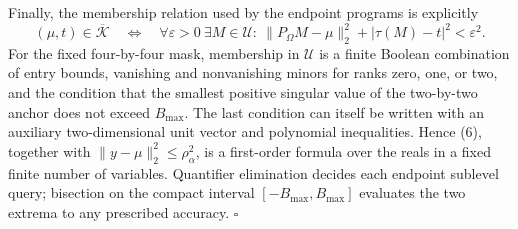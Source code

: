 Finally, the membership relation used by the endpoint programs is explicitly
\[
 (\mu,t)\in\overline{\mathcal K}
 \quad\Longleftrightarrow\quad
 \forall\varepsilon>0\ \exists M\in\mathcal U:\
 \lVert P_\Omega M-\mu\rVert_2^2+|\tau(M)-t|^2<\varepsilon^2.
\tag{6}
\]
For the fixed four-by-four mask, membership in \(\mathcal U\) is a finite Boolean combination of entry bounds, vanishing and nonvanishing minors for ranks zero, one, or two, and the condition that the smallest positive singular value of the two-by-two anchor does not exceed \(B_{\max}\).  The last condition can itself be written with an auxiliary two-dimensional unit vector and polynomial inequalities.  Hence (6), together with
\(\lVert y-\mu\rVert_2^2\leq\rho_\alpha^2\), is a first-order formula over the reals in a fixed finite number of variables.  Quantifier elimination decides each endpoint sublevel query; bisection on the compact interval \([-B_{\max},B_{\max}]\) evaluates the two extrema to any prescribed accuracy. \(\square\)
